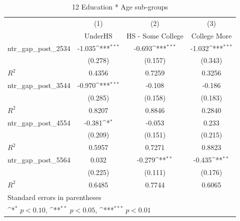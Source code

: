 \documentclass[12pt, final]{CSP}
\begin{document}
\begin{table}[htbp]\centering
\def\sym#1{\ifmmode^{#1}\else\(^{#1}\)\fi}
\caption{12 Education * Age sub-groups}
\begin{tabular}{l*{3}{c}}
\hline 
\hline 
\toprule
                    &\multicolumn{1}{c}{(1)}&\multicolumn{1}{c}{(2)}&\multicolumn{1}{c}{(3)}\\
                    &\multicolumn{1}{c}{UnderHS}&\multicolumn{1}{c}{HS - Some College}&\multicolumn{1}{c}{College More}\\
\hline
\midrule
ntr\_gap\_post\_2534   &   -1.035\sym{***}&   -0.693\sym{***}&   -1.032\sym{***}\\
                    &  (0.278)         &  (0.157)         &  (0.343)         \\
\(R^{2}\)           &   0.4356         &   0.7259         &   0.3256         \\
\hline 
ntr\_gap\_post\_3544   &   -0.970\sym{***}&   -0.108         &   -0.186         \\
                    &  (0.285)         &  (0.158)         &  (0.183)         \\
\midrule
\(R^{2}\)           &   0.8207         &   0.8846         &   0.2840         \\

\hline
ntr\_gap\_post\_4554   &   -0.381\sym{*}  &   -0.053         &    0.233         \\
                    &  (0.209)         &  (0.151)         &  (0.215)         \\
\(R^{2}\)           &   0.5957         &   0.7271         &   0.8823         \\
\hline 
ntr\_gap\_post\_5564   &    0.032         &   -0.279\sym{**} &   -0.435\sym{**} \\
                    &  (0.225)         &  (0.111)         &  (0.176)         \\
\(R^{2}\)           &   0.6485         &   0.7744         &   0.6065         \\
\hline 
\bottomrule
\multicolumn{4}{l}{\footnotesize Standard errors in parentheses}\\
\multicolumn{4}{l}{\footnotesize \sym{*} \(p<0.10\), \sym{**} \(p<0.05\), \sym{***} \(p<0.01\)}\\
\end{tabular}
\end{table}
\end{document}
